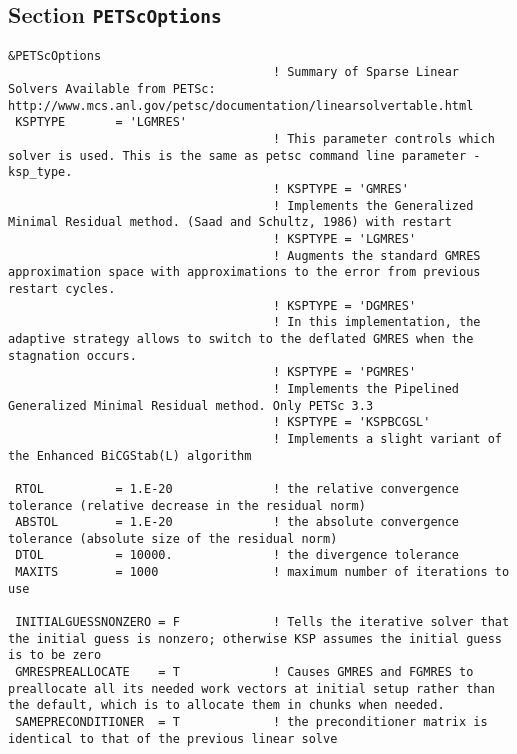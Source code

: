 \documentclass[12pt]{amsart}
\begin{document}
\subsection{Section {\tt PETScOptions}}
\begin{verbatim}
&PETScOptions
                                     ! Summary of Sparse Linear Solvers Available from PETSc: http://www.mcs.anl.gov/petsc/documentation/linearsolvertable.html
 KSPTYPE       = 'LGMRES'
                                     ! This parameter controls which solver is used. This is the same as petsc command line parameter -ksp_type.
                                     ! KSPTYPE = 'GMRES'
                                     ! Implements the Generalized Minimal Residual method. (Saad and Schultz, 1986) with restart
                                     ! KSPTYPE = 'LGMRES'
                                     ! Augments the standard GMRES approximation space with approximations to the error from previous restart cycles.
                                     ! KSPTYPE = 'DGMRES'
                                     ! In this implementation, the adaptive strategy allows to switch to the deflated GMRES when the stagnation occurs.
                                     ! KSPTYPE = 'PGMRES'
                                     ! Implements the Pipelined Generalized Minimal Residual method. Only PETSc 3.3
                                     ! KSPTYPE = 'KSPBCGSL'
                                     ! Implements a slight variant of the Enhanced BiCGStab(L) algorithm

 RTOL          = 1.E-20              ! the relative convergence tolerance (relative decrease in the residual norm)
 ABSTOL        = 1.E-20              ! the absolute convergence tolerance (absolute size of the residual norm)
 DTOL          = 10000.              ! the divergence tolerance
 MAXITS        = 1000                ! maximum number of iterations to use

 INITIALGUESSNONZERO = F             ! Tells the iterative solver that the initial guess is nonzero; otherwise KSP assumes the initial guess is to be zero
 GMRESPREALLOCATE    = T             ! Causes GMRES and FGMRES to preallocate all its needed work vectors at initial setup rather than the default, which is to allocate them in chunks when needed.
 SAMEPRECONDITIONER  = T             ! the preconditioner matrix is identical to that of the previous linear solve



\end{verbatim}
\end{document}
